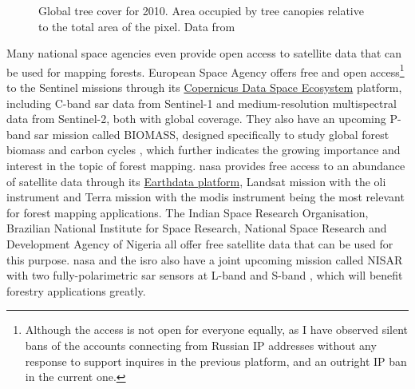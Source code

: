 \begin{figure}
\caption[Global tree cover map]{\label{fig-forest-coverage}Global tree cover for 2010. Area occupied by tree canopies relative to the total area of the pixel. Data from \citet{hansenHighResolutionGlobalMaps2013}
}
\end{figure}

Many national space agencies even provide open access to satellite data that can be used for mapping forests.
European Space Agency offers free and open access\footnote{Although the access is not open for everyone equally, as I have observed silent bans of the accounts connecting from Russian IP addresses without any response to support inquires in the previous platform, and an outright IP ban in the current one.} to the Sentinel missions through its \href{https://dataspace.copernicus.eu/}{Copernicus Data Space Ecosystem} platform, including C-band \gls{sar} data from Sentinel-1 and medium-resolution multispectral data from Sentinel-2, both with global coverage.
They also have an upcoming P-band \gls{sar} mission called BIOMASS, designed specifically to study global forest biomass and carbon cycles \citep{queganEuropeanSpaceAgency2019}, which further indicates the growing importance and interest in the topic of forest mapping.
\gls{nasa} provides free access to an abundance of satellite data through its \href{https://www.earthdata.nasa.gov/}{Earthdata platform}, Landsat mission with the \gls{oli} instrument and Terra mission with the \gls{modis} instrument being the most relevant for forest mapping applications.
The Indian Space Research Organisation, Brazilian National Institute for Space Research, National Space Research and Development Agency of Nigeria all offer free satellite data that can be used for this purpose.
\gls{nasa} and the \gls{isro} also have a joint upcoming mission called NISAR with two fully-polarimetric \gls{sar} sensors at L-band and S-band \citep{kelloggNASAISROSyntheticAperture2020}, which will benefit forestry applications greatly.

